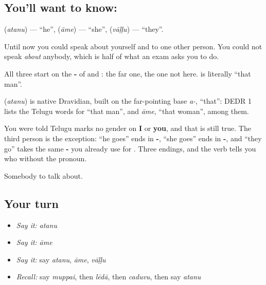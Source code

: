 \subsection*{You'll want to know: }
\textbf{} (\emph{atanu}) — \textquotedblleft{}he\textquotedblright{}, \textbf{} (\emph{āme}) — \textquotedblleft{}she\textquotedblright{}, \textbf{} (\emph{vāḷḷu}) — \textquotedblleft{}they\textquotedblright{}.

Until now you could speak about yourself and to one other person. You could not speak \emph{about} anybody, which is half of what an exam asks you to do.

All three start on the \textbf{-} of  and : the far one, the one not here.  is literally \textquotedblleft{}that man\textquotedblright{}.

\begin{cousinweb}
\textbf{} (\emph{atanu}) is native Dravidian, built on the far-pointing base \emph{a-}, \textquotedblleft{}that\textquotedblright{}: DEDR 1 lists the Telugu words for \textquotedblleft{}that man\textquotedblright{}, and \emph{āme}, \textquotedblleft{}that woman\textquotedblright{}, among them.
\end{cousinweb}

\begin{grammarlens}[title={Grammar Lens: the third person is where Telugu marks gender}]
You were told Telugu marks no gender on \textbf{I} or \textbf{you}, and that is still true. The third person is the exception: \textbf{ } \textquotedblleft{}he goes\textquotedblright{} ends in \textbf{-}, \textbf{ } \textquotedblleft{}she goes\textquotedblright{} ends in \textbf{-}, and \textbf{ } \textquotedblleft{}they go\textquotedblright{} takes the same \textbf{-} you already use for . Three endings, and the verb tells you who without the pronoun.
\end{grammarlens}

\begin{grammarlens}[title={What you've built}]
Somebody to talk about.
\end{grammarlens}

\subsection*{Your turn}
\begin{itemize}
\raggedright
  \item \emph{Say it:} \emph{atanu}
  \item \emph{Say it:} \emph{āme}
  \item \emph{Say it:} say \emph{atanu}, \emph{āme}, \emph{vāḷḷu}
  \item \emph{Recall:} say \emph{muppai}, then \emph{lēdā}, then \emph{caduvu}, then say \emph{atanu}
\end{itemize}

